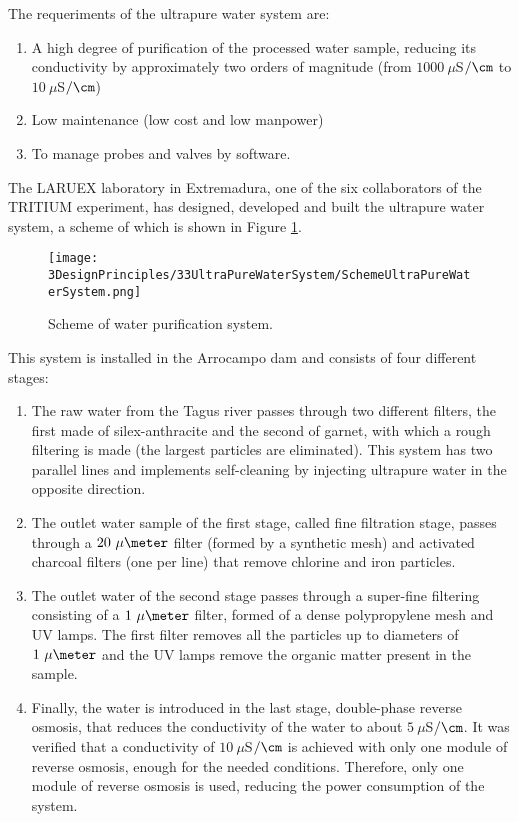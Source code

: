The requeriments of the ultrapure water system are:

\begin{enumerate}

\item{} A high degree of purification of the processed water sample, reducing its conductivity by approximately two orders of magnitude (from $1000~\mu$S$/\cm$ to $10~\mu$S$/\cm$)

\item{} Low maintenance (low cost  and low manpower)

\item{} To manage probes and valves by software.
\end{enumerate}

The LARUEX laboratory in Extremadura, one of the six collaborators of the TRITIUM experiment, has designed, developed and built the ultrapure water system, a scheme of which is shown in Figure \ref{fig:WPSScheme}.

\begin{figure}[htbp]
\centering
\texttt{[image: 3DesignPrinciples/33UltraPureWaterSystem/SchemeUltraPureWaterSystem.png]}
\caption{Scheme of water purification system.\label{fig:WPSScheme}}
\end{figure}

This system is installed in the Arrocampo dam and consists of four different stages:

\begin{enumerate}
\item{} The raw water from the Tagus river passes through two different filters, the first made of silex-anthracite and the second of garnet, with which a rough filtering is made (the largest particles are eliminated). This system has two parallel lines and implements self-cleaning by injecting ultrapure water in the opposite direction.

\item{} The outlet water sample of the first stage, called fine filtration stage, passes through a $20~\mu\meter$ filter (formed by a synthetic mesh) and activated charcoal filters (one per line) that remove chlorine and iron particles.

\item{} The outlet water of the second stage passes through a super-fine filtering consisting of a $1~\mu\meter$ filter, formed of a dense polypropylene mesh and UV lamps. The first filter removes all the particles up to diameters of $1~\mu\meter$ and the UV lamps remove the organic matter present in the sample.

\item{} Finally, the water is introduced in the last stage, double-phase reverse osmosis, that reduces the conductivity of the water to about $5~\mu$S$/\cm$. It was verified that a conductivity of $10~\mu$S$/\cm$ is achieved with only one module of reverse osmosis, enough for the needed conditions. Therefore, only one module of reverse osmosis is used, reducing the power consumption of the system.

\end{enumerate}

